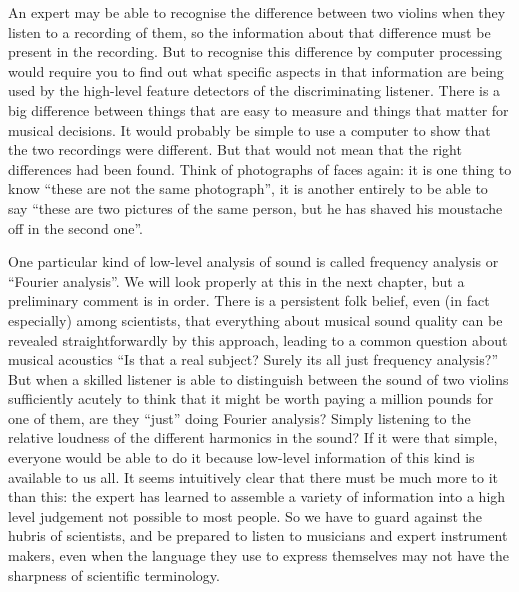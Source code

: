   An expert may be able to recognise the difference between two violins when 
  they listen to a recording of them, so the information about that difference 
  must be present in the recording. But to recognise this difference by 
  computer processing would require you to find out what specific aspects in 
  that information are being used by the high-level feature detectors of the 
  discriminating listener. There is a big difference between things that are 
  easy to measure and things that matter for musical decisions. It would 
  probably be simple to use a computer to show that the two recordings were 
  different. But that would not mean that the right differences had been found. 
  Think of photographs of faces again: it is one thing to know ``these are not 
  the same photograph'', it is another entirely to be able to say ``these are 
  two pictures of the same person, but he has shaved his moustache off in the 
  second one''. 

  One particular kind of low-level analysis of sound is called frequency 
  analysis or ``Fourier analysis''. We will look properly at this in the next 
  chapter, but a preliminary comment is in order. There is a persistent folk 
  belief, even (in fact especially) among scientists, that everything about 
  musical sound quality can be revealed straightforwardly by this approach, 
  leading to a common question about musical acoustics ``Is that a real 
  subject? Surely its all just frequency analysis?'' But when a skilled 
  listener is able to distinguish between the sound of two violins sufficiently 
  acutely to think that it might be worth paying a million pounds for one of 
  them, are they ``just'' doing Fourier analysis? Simply listening to the 
  relative loudness of the different harmonics in the sound? If it were that 
  simple, everyone would be able to do it because low-level information of this 
  kind is available to us all. It seems intuitively clear that there must be 
  much more to it than this: the expert has learned to assemble a variety of 
  information into a high level judgement not possible to most people. So we 
  have to guard against the hubris of scientists, and be prepared to listen to 
  musicians and expert instrument makers, even when the language they use to 
  express themselves may not have the sharpness of scientific terminology. 

